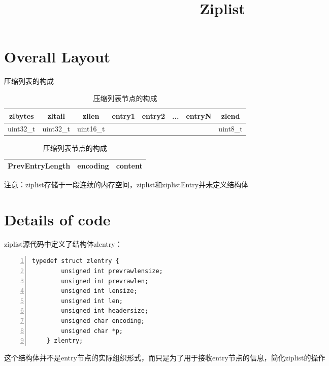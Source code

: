 \documentclass[UTF8,a4paper]{ctexart}
\begin{document}
	\title{Ziplist}
	\date{}
	\maketitle
	
	
	\section{Overall Layout}
		\begin{table}[!hbp]
		
		\caption{压缩列表的构成}
		\begin{tabular}{|c|c|c|c|c|c|c|c|}
			\hline
				zlbytes & zltail & zllen & entry1 & entry2 & ... & entryN & zlend \\
			\hline
				uint32\_t & uint32\_t & uint16\_t & & & & & uint8\_t \\
			\hline
		\end{tabular}

		\begin{center}
		\caption{压缩列表节点的构成}
		\begin{tabular}{|c|c|c|}
			\hline
			PrevEntryLength & encoding & content  \\
			\hline		
		\end{tabular}	
		\end{center}
	
		\end{table}
	
	\par 注意：ziplist存储于一段连续的内存空间，ziplist和ziplistEntry并未定义结构体
	
	\section{Details of code}
	
	ziplist源代码中定义了结构体zlentry：
	\begin{lstlisting}[language={[ANSI]C},numbers=left]
	typedef struct zlentry {
		unsigned int prevrawlensize; 
		unsigned int prevrawlen;    
		unsigned int lensize;        
		unsigned int len;            
		unsigned int headersize;     
		unsigned char encoding;
		unsigned char *p;            
	} zlentry;
	\end{lstlisting}
	这个结构体并不是entry节点的实际组织形式，而只是为了用于接收entry节点的信息，简化ziplist的操作
	
\end{document}
